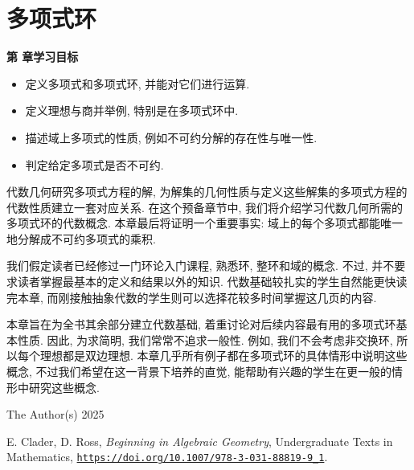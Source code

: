 \chapter{多项式环}\label{chap:polynomial-rings}

\noindent\textbf{第 \thechapter{} 章学习目标}
\begin{itemize}
  \item 定义多项式和多项式环, 并能对它们进行运算.
  \item 定义理想与商并举例, 特别是在多项式环中.
  \item 描述域上多项式的性质, 例如不可约分解的存在性与唯一性.
  \item 判定给定多项式是否不可约.
\end{itemize}

代数几何研究多项式方程的解, 为解集的几何性质与定义这些解集的多项式方程的代数性质建立一套对应关系. 在这个预备章节中, 我们将介绍学习代数几何所需的多项式环的代数概念. 本章最后将证明一个重要事实: 域上的每个多项式都能唯一地分解成不可约多项式的乘积.

我们假定读者已经修过一门环论入门课程, 熟悉环, 整环和域的概念. 不过, 并不要求读者掌握最基本的定义和结果以外的知识. 代数基础较扎实的学生自然能更快读完本章, 而刚接触抽象代数的学生则可以选择花较多时间掌握这几页的内容.

本章旨在为全书其余部分建立代数基础, 着重讨论对后续内容最有用的多项式环基本性质. 因此, 为求简明, 我们常常不追求一般性. 例如, 我们不会考虑非交换环, 所以每个理想都是双边理想. 本章几乎所有例子都在多项式环的具体情形中说明这些概念, 不过我们希望在这一背景下培养的直觉, 能帮助有兴趣的学生在更一般的情形中研究这些概念.

\par\smallskip
{\footnotesize
\noindent\textcopyright{} The Author(s) 2025\par
\noindent E. Clader, D. Ross, \emph{Beginning in Algebraic Geometry}, Undergraduate Texts in Mathematics,
\href{https://doi.org/10.1007/978-3-031-88819-9_1}{\nolinkurl{https://doi.org/10.1007/978-3-031-88819-9_1}}.\par}
